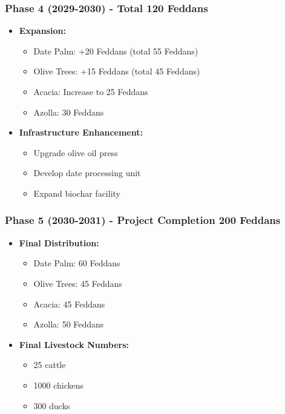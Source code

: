 \subsubsection{Phase 4 (2029-2030) - Total 120 Feddans}
\begin{itemize}
    \item \textbf{Expansion:}
    \begin{itemize}
        \item Date Palm: +20 Feddans (total 55 Feddans)
        \item Olive Trees: +15 Feddans (total 45 Feddans)
        \item Acacia: Increase to 25 Feddans
        \item Azolla: 30 Feddans
    \end{itemize}
    
    \item \textbf{Infrastructure Enhancement:}
    \begin{itemize}
        \item Upgrade olive oil press
        \item Develop date processing unit
        \item Expand biochar facility
    \end{itemize}
\end{itemize}

\subsubsection{Phase 5 (2030-2031) - Project Completion 200 Feddans}
\begin{itemize}
    \item \textbf{Final Distribution:}
    \begin{itemize}
        \item Date Palm: 60 Feddans
        \item Olive Trees: 45 Feddans
        \item Acacia: 45 Feddans
        \item Azolla: 50 Feddans
    \end{itemize}
    
    \item \textbf{Final Livestock Numbers:}
    \begin{itemize}
        \item 25 cattle
        \item 1000 chickens
        \item 300 ducks
    \end{itemize}
\end{itemize}

